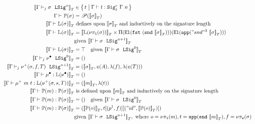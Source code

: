 \begin{align*}
  \denotesT{\goodSigU{j}{\Gamma}{\lsig}{n}} &\in \setc{t}{ \goodTerm{\Gm}{t}{\Sigr{\Gm}{n}{j}} } \\
  {\goodType{\Gamma}{\TyTkg{\lsig}}{}} &= \mathscr{P}(\denotesT{\lsig}) \\
  \denotesT{\goodType{\Gamma}{\TyLkg{\sigma}}{}} &\text{ defines upon } \denotesT{\lsig} 
  \text{ and inductively on the signature length} \\
  \denotesT{\goodType{\Gamma}{\TyLkg{\sigma}}{}} &=
  \denotesT{\TyLkg{\lsigproj{1}{\sigma}}} \times \Pi(\El{\fst{(\snd{\denotesT{\sigma}})}})(\El{\app{"snd"^3~\denotesT{\sigma}}}) \\
  &\text{given } \denotesT{\goodSig{\Gamma}{\sigma}{n+1}} \\
  \denotesT{\goodType{\Gamma}{\TyLkg{\sigma}}{}} &= \top \quad
  \text{given } \denotesT{\goodSig{\Gamma}{\sigma}{0}} \\
  \denotesT{\goodSigU{j}{\Gamma}{\LSigEmp}{0}} &= \unit \\
  \denotesT{\goodSigU{j}{\Gamma}{\LSigAdd{\sigma}{f}{T}}{n+1}} &= (\denotesT{\sigma}, \codety{A}, \lam{f}, \lam{\codety{T}}) \\
  \denotesT{\goodTerm{\Gamma}{\LkgEmp}{\TyLkg{\LSigEmp}}} &= \unit \\
  \denotesT{\goodTerm{\Gamma}{\mu^+~m~t}{\TyLkg{\LSigAdd{\sigma}{s}{T}}}} &= (\denotesT{m}, \lam{t}) \\
  \denotesT{\goodTerm{\Gamma}{\Tkg{m}}{\TyTkg {\sigma}}} & \text{ is defined upon } \denotesT{m} \text{ and inductively on the signature length} \\
  \denotesT{\goodTerm{\Gamma}{\Tkg {m}}{\TyTkg {\sigma}}} &= () \quad \text{given } \denotesT{\goodSig{\Gamma}{\sigma}{0}} \\
  \denotesT{\goodTerm{\Gamma}{\Tkg {m}}{\TyTkg {\sigma}}} &= 
  (\denotesT{\Tkg {o}}, t[(\SubstExt{p^1}{f})][(\SubstExt{"id"}{\denotesT{\Tkg {o}}})]) \\
  & \text{given } \denotesT{\goodSig{\Gamma}{\sigma}{n+1}}, \text{ where } o = \lsigproj{1}{m}, t = \app{\snd{\denotesT{m}}}, f = \lsigproj{s}{\lsig}
\end{align*}



